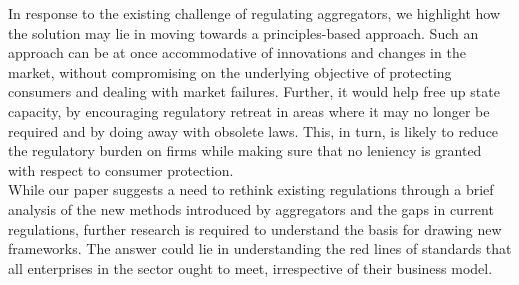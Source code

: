 \documentclass[a4paper, 12pt]{article}
\begin{document}
In response to the existing challenge of regulating aggregators, we highlight how the solution may lie in moving towards a principles-based approach. Such an approach can be at once accommodative of innovations and changes in the market, without compromising on the underlying objective of protecting consumers and dealing with market failures. Further, it would help free up state capacity, by encouraging regulatory retreat in areas where it may no longer be required and by doing away with obsolete laws. This, in turn, is likely to reduce the regulatory burden on firms while making sure that no leniency is granted with respect to consumer protection. \\

While our paper suggests a need to rethink existing regulations through a brief analysis of the new methods introduced by aggregators and the gaps in current regulations, further research is required to understand the basis for drawing new frameworks. The answer could lie in understanding the red lines of standards that all enterprises in the sector ought to meet, irrespective of their business model.

               
         

	\printbibliography[title={Bibliography}]
	\newpage

\end{document}
